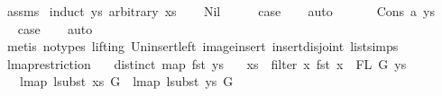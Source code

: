 \begin{isabellebody}
%
\isadelimproof
%
\endisadelimproof
%
\isatagproof
{}\isamarkupfalse%
\ assms\isanewline
{}\isamarkupfalse%
\ {\isacharparenleft}{\kern0pt}induct\ ys\ arbitrary{\isacharcolon}{\kern0pt}\ xs{\isacharparenright}{\kern0pt}\isanewline
\ \ \isamarkupfalse%
\ Nil\isanewline
\ \ \isamarkupfalse%
\ \isamarkupfalse%
\ {\isacharquery}{\kern0pt}case\isanewline
\ \ \isamarkupfalse%
\ auto\isanewline
\ \ \isamarkupfalse%
\isanewline
{}\isamarkupfalse%
\isanewline
\ \ \isamarkupfalse%
\ {\isacharparenleft}{\kern0pt}Cons\ a\ ys{\isacharparenright}{\kern0pt}\isanewline
\ \ \isamarkupfalse%
\ \isamarkupfalse%
\ {\isacharquery}{\kern0pt}case\isanewline
\ \ \isamarkupfalse%
\ auto\isanewline
\ \ \isamarkupfalse%
\ {\isacharparenleft}{\kern0pt}metis\ {\isacharparenleft}{\kern0pt}no{\isacharunderscore}{\kern0pt}types{\isacharcomma}{\kern0pt}\ lifting{\isacharparenright}{\kern0pt}\ Un{\isacharunderscore}{\kern0pt}insert{\isacharunderscore}{\kern0pt}left\ image{\isacharunderscore}{\kern0pt}insert\ insert{\isacharunderscore}{\kern0pt}disjoint{\isacharparenleft}{\kern0pt}{}{\isacharparenright}{\kern0pt}\ list{\isachardot}{\kern0pt}simps{\isacharparenleft}{\kern0pt}{}{}{\isacharparenright}{\kern0pt}{\isacharparenright}{\kern0pt}\isanewline
{}\isamarkupfalse%
%
\endisatagproof
{\isafoldproof}%
%
\isadelimproof
\isanewline
%
\endisadelimproof
\isanewline
\isanewline
{}\isamarkupfalse%
\ lmap{\isacharunderscore}{\kern0pt}restriction{\isacharcolon}{\kern0pt}\isanewline
\ \ \ {\isachardoublequoteopen}distinct\ {\isacharparenleft}{\kern0pt}map\ fst\ ys{\isacharparenright}{\kern0pt}{\isachardoublequoteclose}\isanewline
\ \ \ {\isachardoublequoteopen}xs\ {\isacharequal}{\kern0pt}\ filter\ {\isacharparenleft}{\kern0pt}{\isasymlambda}x{\isachardot}{\kern0pt}\ fst\ x\ {\isasymin}\ FL\ G{\isacharparenright}{\kern0pt}\ ys{\isachardoublequoteclose}\isanewline
\ \ \ {\isachardoublequoteopen}lmap\ {\isacharparenleft}{\kern0pt}lsubst\ xs{\isacharparenright}{\kern0pt}\ G\ {\isacharequal}{\kern0pt}\ lmap\ {\isacharparenleft}{\kern0pt}lsubst\ ys{\isacharparenright}{\kern0pt}\ G{\isachardoublequoteclose}\isanewline
%
\isadelimproof
%
\endisadelimproof
%
\isatagproof
{}\isamarkupfalse%

\end{isabellebody}
